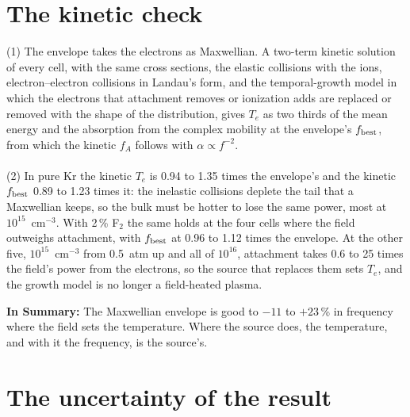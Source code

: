 \documentclass[11pt]{article}
\numberwithin{equation}{section}
\newcommand{\fbest}{f_{\rm best}}
\newcommand{\Te}{T_e}
\begin{document}
\section{The kinetic check}
\label{sec:kinetic}
{\noindent}(1) The envelope takes the electrons as Maxwellian. A two-term kinetic
solution \cite{HP2005} of every cell, with the same cross sections, the elastic collisions
with the ions, electron--electron collisions in Landau's form, and the temporal-growth
model in which the electrons that attachment removes or ionization adds are replaced or
removed with the shape of the distribution, gives $\Te$ as two thirds of the mean energy
and the absorption from the complex mobility at the envelope's $\fbest$, from which the
kinetic $f_A$ follows with $\alpha\propto f^{-2}$.
\\ \\
{\noindent}(2) In pure Kr the kinetic $\Te$ is 0.94 to 1.35 times the envelope's and the
kinetic $\fbest$ 0.89 to 1.23 times it: the inelastic collisions deplete the tail that a
Maxwellian keeps, so the bulk must be hotter to lose the same power, most at
$10^{15}$~cm$^{-3}$. With 2\,\% F$_2$ the same holds at the four cells where the field
outweighs attachment, with $\fbest$ at 0.96 to 1.12 times the envelope. At the other five,
$10^{15}$~cm$^{-3}$ from 0.5~atm up and all of $10^{16}$, attachment takes 0.6 to 25 times the
field's power from the electrons, so the source that replaces them sets $\Te$, and the
growth model is no longer a field-heated plasma.

\medskip
\noindent\textbf{In Summary:} The Maxwellian envelope is good to $-11$ to $+23$\,\% in
frequency where the field sets the temperature. Where the source does, the temperature,
and with it the frequency, is the source's.


\section{The uncertainty of the result}
\label{sec:uncertainty}
\end{document}
